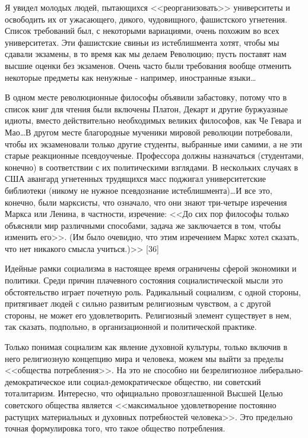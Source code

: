 \documentclass{book}
\begin{document}
Я увидел молодых людей, пытающихся <<реорганизовать>> университеты и освободить их от ужасающего, дикого, чудо­вищного, фашистского угнетения. Список требований был, с некоторыми вариациями, очень похожим во всех университе­тах. Эти фашистские свиньи из истеблишмента хотят, чтобы мы сдавали экзамены, в то время как мы делаем Революцию; пусть поставят нам высшие оценки без экзаменов. Очень час­то были требования вообще отменить некоторые предметы как ненужные - например, иностранные языки\ldots

В одном месте революционные философы объявили заба­стовку, потому что в список книг для чтения были включены Платон, Декарт и другие буржуазные идиоты, вместо действи­тельно необходимых великих философов, как Че Гевара и Мао\ldots В другом месте благородные мученики мировой революции по­требовали, чтобы их экзаменовали только другие студенты, вы­бранные ими самими, а не эти старые реакционные псевдо­ученые. Профессора должны назначаться (студентами, конеч­но) в соответствии с их политическими взглядами. В несколь­ких случаях в США авангард угнетенных трудящихся масс поджигал университетские библиотеки (никому не нужное псевдознание истеблишмента)\ldots И все это, конечно, были марк­систы, что означало, что они знают три-четыре изречения Маркса или Ленина, в частности, изречение: <<До сих пор философы только объясняли мир различными способами, задача же заклю­чается в том, чтобы изменить его>>. (Им было очевидно, что этим изречением Маркс хотел сказать, что нет никакого смысла учиться.)>> [36]

Идейные рамки социализма в настоящее время ограничены сферой экономики и политики. Среди причин плачевного состояния социалистической мысли это обстоятельство играет почетную роль. Радикальный социализм, с одной стороны, притягивает людей с сильно развитым религиозным чувством, а с другой стороны, не может его удовлетворить. Религиозный элемент существует в нем, так сказать, подпольно, в организационной и политической практике.

Только понимая социализм как явление духовной культуры, только включив в него религиозную концепцию мира и человека, можем мы выйти за пределы <<общества потребления>>. На это не способно ни безрелигиозное либерально-демократическое или социал-демократическое общество, ни советский тоталитаризм. Интересно, что официально провозглашенной Высшей Целью советского общества является <<максимальное удовлетворение постоянно растущих материальных и духовных потребностей человека>>. Это предельно точная формулировка того, что такое общество потребления.
\end{document}
